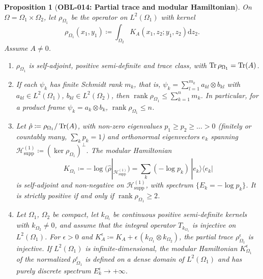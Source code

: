 \documentclass[11pt,a4paper,reqno]{amsart}
\newtheorem{proposition}[theorem]{Proposition}
\theoremstyle{definition}
\theoremstyle{remark}
\numberwithin{equation}{section}
\newcommand{\dif}{\mathrm{d}}
\begin{document}
\begin{proposition}[\textbf{OBL-014: Partial trace and modular Hamiltonian}]
\label{thm:modular_hamiltonian_spec}
On $\Omega = \Omega_1 \times \Omega_2$, let $\rho_{\Omega_1}$ be the operator on $L^2(\Omega_1)$ with kernel
\begin{equation}
\rho_{\Omega_1}(x_1, y_1) \coloneqq \int_{\Omega_2} K_A(x_1, z_2; y_1, z_2) \dif z_2 .
\end{equation}
Assume $A \ne 0$.
\begin{enumerate}
\item $\rho_{\Omega_1}$ is self-adjoint, positive semi-definite and trace class, with $\Tr\rho_{\Omega_1} = \Tr(A)$.
\item If each $\psi_k$ has finite Schmidt rank \cite{Schmidt1907} $m_k$, that is, $\psi_k = \sum_{l=1}^{m_k} a_{kl}\otimes b_{kl}$ with $a_{kl} \in L^2(\Omega_1)$, $b_{kl} \in L^2(\Omega_2)$, then $\operatorname{rank}\rho_{\Omega_1} \le \sum_{k=1}^n m_k$. In particular, for a product frame $\psi_k = a_k \otimes b_k$, $\operatorname{rank}\rho_{\Omega_1} \le n$.
\item Let $\hat\rho \coloneqq \rho_{\Omega_1}/\Tr(A)$, with non-zero eigenvalues $p_1 \ge p_2 \ge \dots > 0$ (finitely or countably many, $\sum_k p_k = 1$) and orthonormal eigenvectors $e_k$ spanning $\mathcal{H}_{\mathrm{supp}}^{(1)} \coloneqq (\ker \rho_{\Omega_1})^\perp$. The modular Hamiltonian
\begin{equation}
K_{\Omega_1} \coloneqq -\log\big(\hat\rho|_{\mathcal{H}_{\mathrm{supp}}^{(1)}}\big) = \sum_k (-\log p_k)\,|e_k\rangle\langle e_k|
\end{equation}
is self-adjoint and non-negative on $\mathcal{H}_{\mathrm{supp}}^{(1)}$, with spectrum $\{E_k = -\log p_k\}$. It is strictly positive if and only if $\operatorname{rank}\rho_{\Omega_1} \ge 2$.
\item Let $\Omega_1$, $\Omega_2$ be compact, let $k_{\Omega_i}$ be continuous positive semi-definite kernels with $k_{\Omega_2} \ne 0$, and assume that the integral operator $T_{k_{\Omega_1}}$ is injective on $L^2(\Omega_1)$. For $\epsilon > 0$ and $K_A^\epsilon \coloneqq K_A + \epsilon\,(k_{\Omega_1} \otimes k_{\Omega_2})$, the partial trace $\rho^\epsilon_{\Omega_1}$ is injective. If $L^2(\Omega_1)$ is infinite-dimensional, the modular Hamiltonian $K^\epsilon_{\Omega_1}$ of the normalized $\rho^\epsilon_{\Omega_1}$ is defined on a dense domain of $L^2(\Omega_1)$ and has purely discrete spectrum $E_k^\epsilon \to +\infty$.
\end{enumerate}
\end{proposition}
\end{document}
